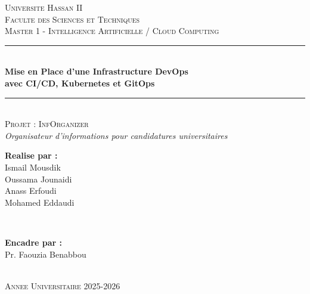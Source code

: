 \documentclass[12pt,a4paper,french]{report}
\begin{document}
\begin{titlepage}
    \centering
    \vspace*{1cm}

    \textsc{\LARGE Universite Hassan II}\\[0.5cm]
    \textsc{\Large Faculte des Sciences et Techniques}\\[0.3cm]
    \textsc{\large Master 1 - Intelligence Artificielle / Cloud Computing}\\[2cm]

    \rule{\linewidth}{0.5mm}\\[0.4cm]
    {\huge\bfseries Mise en Place d'une Infrastructure DevOps\\[0.2cm]
    avec CI/CD, Kubernetes et GitOps}\\[0.2cm]
    \rule{\linewidth}{0.5mm}\\[1.5cm]

    \textsc{\Large Projet : InfOrganizer}\\[0.3cm]
    \textit{Organisateur d'informations pour candidatures universitaires}\\[2cm]

    \begin{minipage}{0.4\textwidth}
        \begin{flushleft}
            \large
            \textbf{Realise par :}\\
            Ismail Mousdik\\
            Oussama Jounaidi\\
            Anass Erfoudi\\
            Mohamed Eddaudi\\
            
        \end{flushleft}
    \end{minipage}
    ~
    \begin{minipage}{0.4\textwidth}
        \begin{flushright}
            \large
            \textbf{Encadre par :}\\
            Pr. Faouzia Benabbou\\
        \end{flushright}
    \end{minipage}\\[3cm]

    \textsc{\large Annee Universitaire 2025-2026}\\[1cm]

    \vfill

\end{titlepage}
\end{document}
